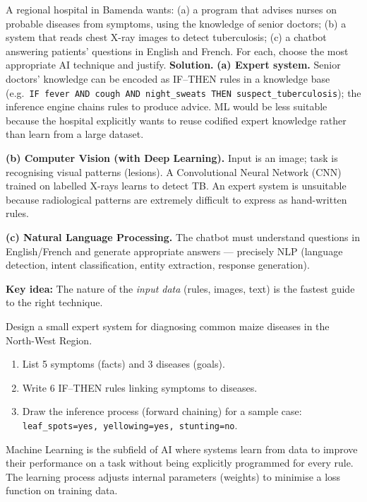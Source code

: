 \documentclass[11pt]{article}
\newcommand{\cle}[1]{{\popxbold\color{popdark}#1}}
\newcounter{popsec}
\newcounter{popsub}
\newcommand{\courssub}[1]{%
  \stepcounter{popsub}%
  \par\vspace{9pt}\noindent{\popxbold\fontsize{11.5}{13}\selectfont\color{popink}{\color{poporange}\thepopsec.\thepopsub}\hspace{6pt}#1}\par\nopagebreak\vspace{4pt}
}
\begin{document}
\begin{exoresolu}
A regional hospital in Bamenda wants: (a) a program that advises nurses on probable diseases from symptoms, using the knowledge of senior doctors; (b) a system that reads chest X-ray images to detect tuberculosis; (c) a chatbot answering patients' questions in English and French. For each, choose the most appropriate AI technique and justify.
\tcblower
\textbf{Solution.}
\textbf{(a) Expert system.} Senior doctors' knowledge can be encoded as IF--THEN rules in a knowledge base (e.g.\ \texttt{IF fever AND cough AND night\_sweats THEN suspect\_tuberculosis}); the inference engine chains rules to produce advice. ML would be less suitable because the hospital explicitly wants to reuse codified expert knowledge rather than learn from a large dataset.

\textbf{(b) Computer Vision (with Deep Learning).} Input is an image; task is recognising visual patterns (lesions). A Convolutional Neural Network (CNN) trained on labelled X-rays learns to detect TB. An expert system is unsuitable because radiological patterns are extremely difficult to express as hand-written rules.

\textbf{(c) Natural Language Processing.} The chatbot must understand questions in English/French and generate appropriate answers — precisely NLP (language detection, intent classification, entity extraction, response generation).

\textbf{Key idea:} The nature of the \emph{input data} (rules, images, text) is the fastest guide to the right technique.
\end{exoresolu}

\begin{experience}
Design a small expert system for diagnosing common maize diseases in the North-West Region.
\begin{enumerate}
\item List 5 symptoms (facts) and 3 diseases (goals).
\item Write 6 IF--THEN rules linking symptoms to diseases.
\item Draw the inference process (forward chaining) for a sample case: \texttt{leaf\_spots=yes, yellowing=yes, stunting=no}.
\end{enumerate}
\end{experience}

\courssub{Machine Learning}

\begin{definition}
Machine Learning is the subfield of AI where systems \cle{learn from data} to improve their performance on a task without being explicitly programmed for every rule. The learning process adjusts internal parameters (weights) to minimise a loss function on training data.
\end{definition}
\end{document}
